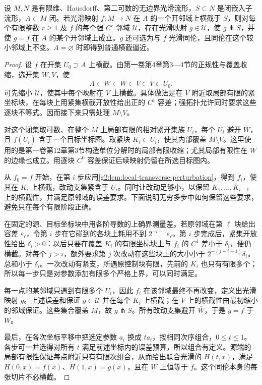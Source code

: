 \begin{theorem}\label{g2:thm:relative-transversality}
	设 \(M,N\) 是有限维、Hausdorff、第二可数的无边界光滑流形，\(S\subset N\) 是闭嵌入子流形，\(A\subset M\) 闭。若光滑映射 \(f:M\to N\) 在 \(A\) 的一个开邻域上横截于 \(S\)，则对每个有限整数 \(r\ge1\) 及 \(f\) 的每个强 \(C^r\) 邻域 \(\mathcal U\)，存在光滑映射 \(g\in\mathcal U\)，使 \(g\pitchfork S\)，并使 \(g=f\) 在 \(A\) 的某个开邻域上成立。\(g\) 还可选为与 \(f\) 光滑同伦，且同伦在这个较小邻域上不变。\(A=\varnothing\) 时即得到普通横截逼近。
\end{theorem}
\begin{proof}
	设 \(f\) 在开集 \(U_0\supset A\) 上横截。由第一卷第4章第3—4节的正规性与覆盖收缩，选开集 \(W,V\)，使
	\[
		A\subset W\subset\overline W\subset V\subset\overline V\subset U_0.
	\]
	可先缩小 \(\mathcal U\)，使其中每个映射在 \(\overline V\) 上横截。具体做法是在 \(\overline V\) 附近取局部有限的紧坐标块，在每块上用紧集横截开放性给出正的 \(C^1\) 容差；强拓扑允许同时要求这些逐块不等式。因而接下来只需处理 \(M\setminus V\)。

	对这个闭集取可数、在整个 \(M\) 上局部有限的相对紧开集族 \(U_i\)，每个 \(\overline{U_i}\) 避开 \(\overline W\)，且 \(f(\overline{U_i})\) 含于一个目标坐标图。取紧块 \(K_i\subset U_i\)，使其内部覆盖 \(M\setminus V\)。这里使用的是第一卷第12章第3节构造单位分解时的局部有限收缩；尤其局部有限性在 \(W\) 的边缘也成立。用逐块 \(C^0\) 容差保证后续映射仍留在所选目标图内。

	从 \(f_0=f\) 开始，在第 \(i\) 步应用\cref{g2:lem:local-transverse-perturbation}，得到 \(f_i\)，使其在 \(K_i\) 上横截，改动支集紧含于 \(U_i\)。同时让改动足够小，以保留 \(K_1,\ldots,K_{i-1}\) 上的横截性，并满足原邻域的误差要求。下面说明无穷多步中如何保留这些要求，避免只在每个有限阶段正确。

	在固定的源、目标坐标块中用各阶导数的上确界测量差。若原邻域在第 \(\ell\) 块给出容差 \(\varepsilon_\ell\)，令第 \(i\) 步在它碰到的各块上耗用不到 \(2^{-i-1}\varepsilon_\ell\)。第 \(i\) 步完成后，紧集开放性给出 \(\delta_i>0\)：以后只要在覆盖 \(K_i\) 的有限坐标块上与 \(f_i\) 的 \(C^1\) 差小于 \(\delta_i\)，便仍横截。对每个 \(j>i\)，额外要求第 \(j\) 次改动在这些块上的大小小于 \(2^{-(j-i+1)}\delta_i\)。总和小于 \(\delta_i\)。一次改动有紧支，所遇原控制块有限，先前的 \(K_i\) 也只有有限多个；所以每一步只是对参数添加有限多个严格上界，可以同时满足。

	每一点的某邻域只遇到有限多个 \(U_i\)，因此 \(f_i\) 在该邻域最终不再改变，定义出光滑映射 \(g\)。上述误差和保证 \(g\in\mathcal U\) 并在每个 \(K_i\) 上横截；在 \(\overline V\) 上的横截性由最初缩小的邻域保证。这些集合覆盖 \(M\)，故 \(g\pitchfork S\)。所有改动支集避开 \(\overline W\)，于是 \(g=f\) 于 \(W\)。

	最后，在各次坐标平移中把选定参数 \(a_i\) 换成 \(t a_i\)，按相同次序组合，\(0\le t\le1\)。各步可一并选得对所有 \(t\) 满足前述坐标内的误差预算，所以组合有定义。源端的局部有限性保证每点附近只有有限次组合，从而给出联合光滑的 \(H(t,x)\)，满足 \(H(0,x)=f(x)\)、\(H(1,x)=g(x)\)，且在 \(W\) 上恒等于 \(f\)。这个同伦本身的每张切片不必横截。
\end{proof}

